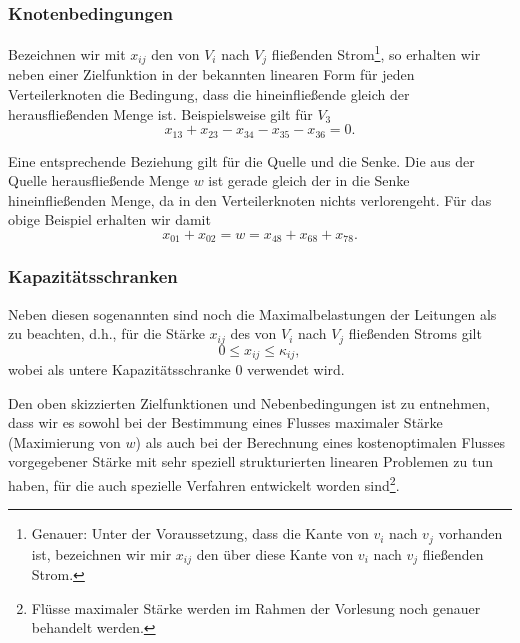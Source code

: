 \documentclass[smaller]{beamer}
\begin{document}
\begin{frame}
 \frametitle{Knotenbedingungen}
 Bezeichnen wir mit $x_{ij}$ den von $V_i$ nach $V_j$ fließenden Strom\footnote{Genauer: Unter der Voraussetzung, dass die Kante von $v_i$ nach $v_j$ vorhanden ist, bezeichnen wir mir $x_{ij}$ den über diese Kante von $v_i$ nach $v_j$ fließenden Strom.}, so erhalten wir neben einer Zielfunktion in der bekannten linearen Form für jeden Verteilerknoten die Bedingung, dass die hineinfließende gleich der herausfließenden Menge ist. Beispielsweise gilt für $V_3$
\[
x_{13} + x_{23} - x_{34} - x_{35} - x_{36} = 0.
\]

Eine entsprechende Beziehung gilt für die Quelle und die Senke. Die aus der Quelle herausfließende Menge $w$ ist gerade gleich der in die Senke hineinfließenden Menge, da in den Verteilerknoten nichts {\glqq}{verlorengeht}{\grqq}. Für das obige Beispiel erhalten wir damit
\[
x_{01} + x_{02} = w = x_{48} + x_{68} + x_{78}.
\]
\end{frame}

\begin{frame}
 \frametitle{Kapazitätsschranken}
 Neben diesen sogenannten  sind noch die Maximalbelastungen der Leitungen als  zu beachten, d.h., für die Stärke $x_{ij}$ des von $V_i$ nach $V_j$ fließenden Stroms gilt
\[
0 \leq x_{ij} \leq \kappa_{ij},
\] 
wobei als untere Kapazitätsschranke 0 verwendet wird.

Den oben skizzierten Zielfunktionen und Nebenbedingungen ist zu entnehmen, dass wir es sowohl bei der Bestimmung eines \alert{Flusses maximaler Stärke} (Maximierung von $w$) als auch bei der Berechnung eines \alert{kostenoptimalen Flusses vorgegebener Stärke} mit sehr speziell strukturierten linearen Problemen zu tun haben, für die auch spezielle Verfahren entwickelt worden sind\footnote{Flüsse maximaler Stärke werden im Rahmen der Vorlesung noch genauer behandelt werden.}.
\end{frame}
\end{document}
